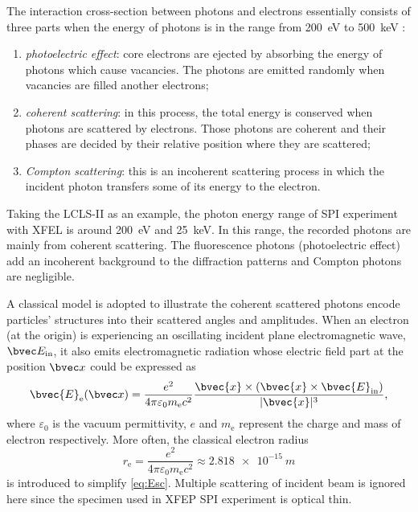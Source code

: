 The interaction cross-section between photons and electrons essentially
consists of three parts when the energy of photons is in the range from
\SI{200}{eV} to \SI{500}{keV} \cite{raubenheimerLCLSIIStatusCW2015}:
\begin{enumerate}
    \item \emph{photoelectric effect}: core electrons are ejected by absorbing the
        energy of photons which cause vacancies. The photons are emitted 
        randomly when vacancies are filled another electrons;
    \item \emph{coherent scattering}: in this process, the total energy is conserved when photons
        are scattered by electrons. Those photons are coherent and their phases are decided by
        their relative position where they are scattered;
    \item \emph{Compton scattering}: this is an incoherent scattering process in which the incident photon transfers some of its energy to the electron.
\end{enumerate}

Taking the LCLS-II as an example\cite{raubenheimerLCLSIIStatusCW2015},
the photon energy range of SPI experiment with XFEL is around \SI{200}{eV} and
\SI{25}{keV}. In this range, the recorded photons are mainly from coherent
scattering\cite{hubbellReviewPhotonInteraction1999}. The fluorescence photons
(photoelectric effect) add an incoherent background to the diffraction patterns
and Compton photons are negligible. 

A classical model is adopted to illustrate the coherent scattered photons
encode particles' structures into their scattered angles and amplitudes.
When an electron (at the origin) is experiencing an oscillating incident plane electromagnetic wave, $\bvec E_\text{in}$,
it also emits electromagnetic radiation whose electric field part at the position $\bvec x$ could be expressed as
\begin{equation}
    \bvec{E}_\text{e}(\bvec x)=\frac{e^2}{4 \pi \varepsilon_{0} m_\text{e} c^{2}}
    \frac{\bvec{x} \times(\bvec{x} \times
    \bvec{E}_{\text{in}})}{|\bvec{x}|^{3}}\text{,}
    \label{eq:Esc}
\end{equation}
where $\varepsilon_{0}$ is the vacuum permittivity, $e$ and $m_\text{e}$ represent the charge and mass of electron respectively.
More often, the classical electron radius\cite{griffithsIntroductionQuantumMechanics2014}
\begin{equation}
    r_\text{e}=\frac{e^{2}}{4 \pi \varepsilon_{0} m_\text{e} c^{2}} \approx \SI{2.818e-15}{m}
    \label{eq:re}
\end{equation}
is introduced to simplify \cref{eq:Esc}. 
Multiple scattering of incident beam is ignored here since the specimen used in XFEP SPI experiment
is optical thin\cite{thibaultAlgorithmicMethodsDiffraction2007}.


